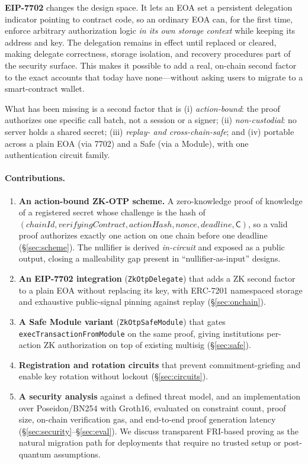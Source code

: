 \documentclass[11pt]{article}
\theoremstyle{definition}
\theoremstyle{plain}
\newcommand{\commit}{\mathsf{C}}
\begin{document}
\textbf{EIP-7702} changes the design space. It lets an EOA set a persistent
delegation indicator pointing to contract code, so an
ordinary EOA can, for the first time, enforce arbitrary authorization logic
\emph{in its own storage context} while keeping its address and key. The
delegation remains in effect until replaced or cleared, making delegate
correctness, storage isolation, and recovery procedures part of the security
surface. This makes it
possible to add a real, on-chain second factor to the exact accounts that today
have none---without asking users to migrate to a smart-contract wallet.

What has been missing is a second factor that is (i) \emph{action-bound}: the proof
authorizes one specific call batch, not a session or a signer; (ii) \emph{non-custodial}:
no server holds a shared secret; (iii) \emph{replay- and cross-chain-safe}; and
(iv) portable across a plain EOA (via 7702) and a Safe (via a Module), with one
authentication circuit family.

\paragraph{Contributions.}
\begin{enumerate}
  \item \textbf{An action-bound ZK-OTP scheme.} A zero-knowledge proof of knowledge
  of a registered secret whose challenge is the hash of
  $(\mathit{chainId}, \mathit{verifyingContract}, \mathit{actionHash}, \mathit{nonce},
  \mathit{deadline}, \commit)$, so a valid proof authorizes exactly one action on one
  chain before one deadline (\S\ref{sec:scheme}). The nullifier is derived
  \emph{in-circuit} and exposed as a public output, closing a malleability gap
  present in ``nullifier-as-input'' designs.
  \item \textbf{An EIP-7702 integration} (\texttt{ZkOtpDelegate}) that adds a ZK
  second factor to a plain EOA without replacing its key, with ERC-7201 namespaced
  storage and exhaustive public-signal pinning against replay (\S\ref{sec:onchain}).
  \item \textbf{A Safe Module variant} (\texttt{ZkOtpSafeModule}) that gates
  \texttt{execTransactionFromModule} on the same proof, giving institutions
  per-action ZK authorization on top of existing multisig (\S\ref{sec:safe}).
  \item \textbf{Registration and rotation circuits} that prevent commitment-griefing
  and enable key rotation without lockout (\S\ref{sec:circuits}).
  \item \textbf{A security analysis} against a defined threat model, and an
  implementation over Poseidon/BN254 with Groth16, evaluated on constraint count,
  proof size, on-chain verification gas, and end-to-end proof generation latency
  (\S\ref{sec:security}--\S\ref{sec:eval}). We discuss transparent FRI-based
  proving as the natural migration path for deployments that require no trusted
  setup or post-quantum assumptions.
\end{enumerate}
\end{document}
